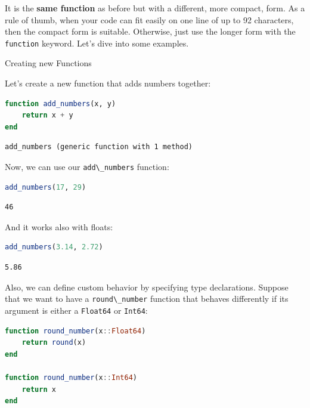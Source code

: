 \documentclass[
  notoc %
]{tufte-book}
\makeatletter
\newcommand{\passthrough}[1]{#1}
\renewcommand\subsubsection{%
\@startsection{subsubsection}{3}{\z@ }{-3.25ex\@plus -1ex \@minus -.2ex}{1.5ex \@plus .2ex}{\normalfont \normalsize \bfseries }
}
\makeatother
\begin{document}
It is the \textbf{same function} as before but with a different, more
compact, form. As a rule of thumb, when your code can fit easily on one
line of up to 92 characters, then the compact form is suitable.
Otherwise, just use the longer form with the
\passthrough{\lstinline!function!} keyword. Let's dive into some
examples.

\hypertarget{sec:function_example}{%
\subsubsection{Creating new Functions}\label{sec:function_example}}

Let's create a new function that adds numbers together:

\begin{lstlisting}[language=Julia]
function add_numbers(x, y)
    return x + y
end
\end{lstlisting}

\begin{lstlisting}[language=Output]
add_numbers (generic function with 1 method)
\end{lstlisting}

Now, we can use our \passthrough{\lstinline!add\_numbers!} function:

\begin{lstlisting}[language=Julia]
add_numbers(17, 29)
\end{lstlisting}

\begin{lstlisting}[language=Output]
46
\end{lstlisting}

And it works also with floats:

\begin{lstlisting}[language=Julia]
add_numbers(3.14, 2.72)
\end{lstlisting}

\begin{lstlisting}[language=Output]
5.86
\end{lstlisting}

Also, we can define custom behavior by specifying type declarations.
Suppose that we want to have a \passthrough{\lstinline!round\_number!}
function that behaves differently if its argument is either a
\passthrough{\lstinline!Float64!} or \passthrough{\lstinline!Int64!}:

\begin{lstlisting}[language=Julia]
function round_number(x::Float64)
    return round(x)
end

function round_number(x::Int64)
    return x
end
\end{lstlisting}
\end{document}
